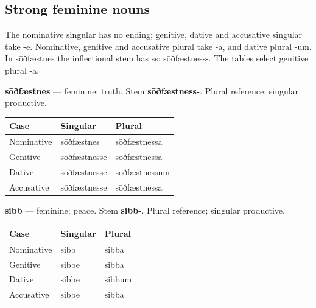 \subsection*{Strong feminine nouns}

The nominative singular has no ending; genitive, dative and accusative singular take -e. Nominative, genitive and accusative plural take -a, and dative plural -um. In sōðfæstnes the inflectional stem has ss: sōðfæstness-. The tables select genitive plural -a.

\textbf{sōðfæstnes} — feminine; truth. Stem \textbf{sōðfæstness-}. Plural reference; singular productive.

\par\begingroup
\fontsize{10.5}{13.2}\selectfont
\setlength{\LTleft}{0pt}\setlength{\LTright}{\fill}
\noindent
\begin{tabular}{@{}>{\raggedright\arraybackslash}p{33.82mm}>{\raggedright\arraybackslash}p{40.59mm}>{\raggedright\arraybackslash}p{43.97mm}@{}}
\toprule
\textbf{Case} & \textbf{Singular} & \textbf{Plural} \\
\midrule
Nominative & sōðfæstnes & sōðfæstnessa \\
Genitive & sōðfæstnesse & sōðfæstnessa \\
Dative & sōðfæstnesse & sōðfæstnessum \\
Accusative & sōðfæstnesse & sōðfæstnessa \\
\bottomrule
\end{tabular}
\par\endgroup

\textbf{sibb} — feminine; peace. Stem \textbf{sibb-}. Plural reference; singular productive.

\par\begingroup
\fontsize{10.5}{13.2}\selectfont
\setlength{\LTleft}{0pt}\setlength{\LTright}{\fill}
\noindent
\begin{tabular}{@{}>{\raggedright\arraybackslash}p{39.46mm}>{\raggedright\arraybackslash}p{39.46mm}>{\raggedright\arraybackslash}p{39.46mm}@{}}
\toprule
\textbf{Case} & \textbf{Singular} & \textbf{Plural} \\
\midrule
Nominative & sibb & sibba \\
Genitive & sibbe & sibba \\
Dative & sibbe & sibbum \\
Accusative & sibbe & sibba \\
\bottomrule
\end{tabular}
\par\endgroup

